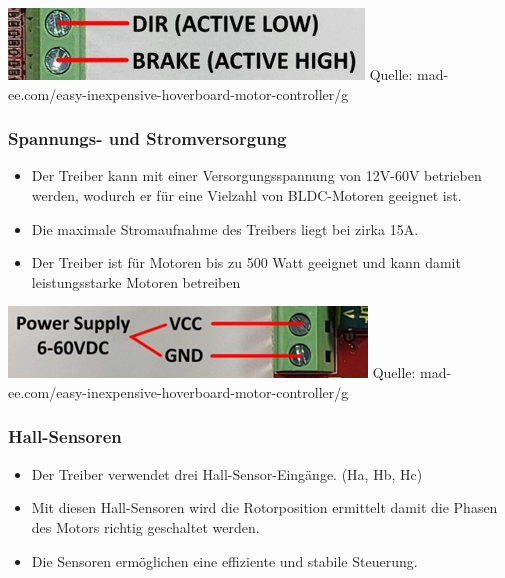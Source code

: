 \documentclass[ngerman,12pt,a4paper]{article}
\begin{document}
		\begin{center}
			\begin{minipage}{\textwidth}
				\centering
				\includegraphics[scale=1]{Pictures/Bremse-Richtungswechsel}
				\label{fig:spiffs_init}
				\vspace{-2pt}
				\small Quelle: mad-ee.com/easy-inexpensive-hoverboard-motor-controller/g
			\end{minipage}
		\end{center}
		
		\subsubsection*{Spannungs- und Stromversorgung}
		\begin{itemize}
			\item Der Treiber kann mit einer Versorgungsspannung von 12V-60V betrieben werden, wodurch er für eine Vielzahl von BLDC-Motoren geeignet ist.
			\item Die maximale Stromaufnahme des Treibers liegt bei zirka 15A.
			\item Der Treiber ist für Motoren bis zu 500 Watt geeignet und kann damit leistungsstarke Motoren betreiben
		\end{itemize}
		
		\begin{center}
			\begin{minipage}{\textwidth}
				\centering
				\includegraphics[scale=1]{Pictures/Versorgung}
				\label{fig:spiffs_init}
				\vspace{-2pt}
				\small Quelle: mad-ee.com/easy-inexpensive-hoverboard-motor-controller/g
			\end{minipage}
		\end{center}
		
		\newpage
		
		\begin{minipage}{\textwidth}
		\subsubsection*{Hall-Sensoren}
		\begin{itemize}
			\item Der Treiber verwendet drei Hall-Sensor-Eingänge. (Ha, Hb, Hc)
			\item Mit diesen Hall-Sensoren wird die Rotorposition ermittelt damit die Phasen des Motors richtig geschaltet werden.
			\item Die Sensoren ermöglichen eine effiziente und stabile Steuerung.
		\end{itemize}
		\end{minipage}
		
\end{document}
